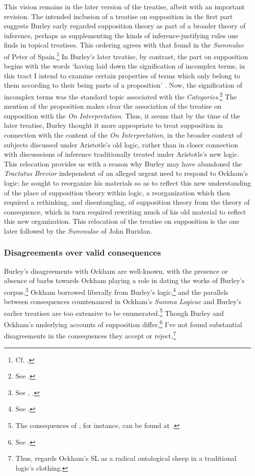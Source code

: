 \documentclass[]{birkjour}
\begin{document}
This vision remains in the later version of the treatise, albeit with an important revision. The intended inclusion of a treatise on supposition in the first part suggests Burley early regarded supposition theory as part of a broader theory of inference, perhaps as supplementing the kinds of inference-justifying rules one finds in topical treatises. This ordering agrees with that found in the \textit{Summulae} of Peter of Spain.\footnote{Cf. \autocite{Klima2003a}.} In Burley's later treatise, by contrast, the part on supposition begins with the words `having laid down the signification of incomplex terms, in this tract I intend to examine certain properties of terms which only belong to them according to their being parts of a proposition' \autocite[p. 1.3-6]{BurleyDPAL}. Now, the signification of incomplex terms was the standard topic associated with the \textit{Categories}.\footnote{See \autocite[p. 65]{Burley2003}.} The mention of the proposition makes clear the association of the treatise on supposition with the \textit{On Interpretation}. Thus, it seems that by the time of the later treatise, Burley thought it more appropriate to treat supposition in connection with the content of the \textit{On Interpretation}, in the broader context of subjects discussed under Aristotle's old logic, rather than in closer connection with discusssions of inference traditionally treated under Aristotle's new logic. This relocation provides us with a reason why Burley may have abandoned the \textit{Tractatus Brevior} independent of an alleged urgent need to respond to Ockham's logic: he sought to reorganize his materials so as to reflect this new understanding of the place of supposition theory within logic, a reorganization which then required a rethinking, and disentangling, of supposition theory from the theory of consequence, which in turn required rewriting much of his old material to reflect this new organization. This relocation of the treatise on supposition is the one later followed by the \textit{Summulae} of John Buridan.

\subsubsection{Disagreements over valid consequences}
Burley's disagreements with Ockham are well-known, with the presence or absence of barbs towards Ockham playing a role in dating the works of Burley's corpus.\footnote{See \autocite{Ottman1999}, \autocite{Vittorini2013}.} Ockham borrowed liberally from Burley's logic,\footnote{See \autocite{Brown1972}.} and the parallels between consequences countenanced in Ockham's \textit{Summa Logicae} and Burley's earlier treatises are too extensive to be enumerated.\footnote{The consequences of \autocite[III-3.38, pp. 727-731]{OckhamSL}, for instance, can be found at \autocite[par. 1, 4, 9, 14-15, 71-72, and 86-88]{Green-Pedersen1980b}.} Though Burley and Ockham's underlying accounts of supposition differ,\footnote{See \autocite{Wagner1981}.} I've not found substantial disagreements in the consequences they accept or reject.\footnote{Thus, \autocite[p. 276]{Read2007} regards Ockham's SL as a radical ontological sheep in a traditional logic's clothing.} 
\end{document}
